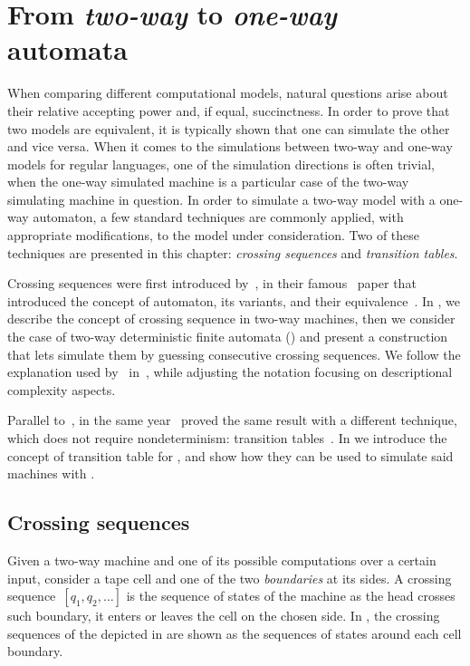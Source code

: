 \chapter{From \emph{two-way} to \emph{one-way} automata}\label{ch:techniques}
When comparing different computational models, natural questions arise about their relative accepting power and, if equal, succinctness.
In order to prove that two models are equivalent, it is typically shown that one can simulate the other and vice versa.
When it comes to the simulations between two-way and one-way models for regular languages, one of the simulation directions is often trivial, when the one-way simulated machine is a particular case of the two-way simulating machine in question.
In order to simulate a two-way model with a one-way automaton, a few standard techniques are commonly applied, with appropriate modifications, to the model under consideration.
Two of these techniques are presented in this chapter: \emph{crossing sequences} and \emph{transition tables}.

Crossing sequences were first introduced by~\citeauthor{RabSco59}, in their famous~\citeyear{RabSco59} paper that introduced the concept of automaton, its variants, and their equivalence~\cite{RabSco59}.
In , we describe the concept of crossing sequence in two-way machines, then we consider the case of two-way deterministic finite automata (\TDFAs) and present a construction that lets \ONFAs simulate them by guessing consecutive crossing sequences.
We follow the explanation used by~\citeauthor{HopUll79} in~\cite{HopUll79}, while adjusting the notation focusing on descriptional complexity aspects.

Parallel to~\citeauthor{RabSco59}, in the same year~\citeauthor{She59} proved the same result with a different technique, which does not require nondeterminism: transition tables~\cite{She59}.
In  we introduce the concept of transition table for \TDFAs, and show how they can be used to simulate said machines with \ODFAs.


\section{Crossing sequences}\label{sec:crossseq2DFA}
Given a two-way machine and one of its possible computations over a certain input, consider a tape cell and one of the two \emph{boundaries} at its sides.
A crossing sequence~$[q_1,q_2,\dots]$ is the sequence of states of the machine as the head crosses such boundary, \ie it enters or leaves the cell on the chosen side.
In , the crossing sequences of the \TDFA depicted in  are shown as the sequences of states around each cell boundary.

